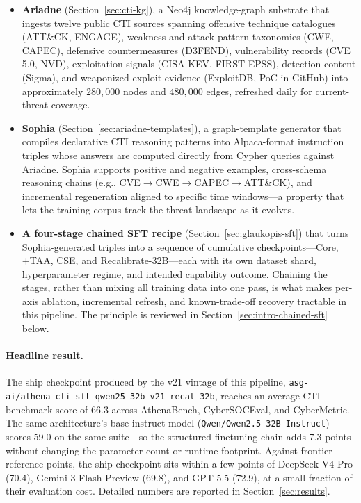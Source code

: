 \documentclass[unnumsec,webpdf,contemporary,large]{oup-authoring-template}
\theoremstyle{thmstyleone}
\theoremstyle{thmstyletwo}
\theoremstyle{thmstylethree}
\begin{document}
\begin{itemize}
  \item \textbf{Ariadne} (Section~\ref{sec:cti-kg}), a Neo4j knowledge-graph substrate that ingests twelve public CTI sources spanning offensive technique catalogues (ATT\&CK, ENGAGE), weakness and attack-pattern taxonomies (CWE, CAPEC), defensive countermeasures (D3FEND), vulnerability records (CVE 5.0, NVD), exploitation signals (CISA KEV, FIRST EPSS), detection content (Sigma), and weaponized-exploit evidence (ExploitDB, PoC-in-GitHub) into approximately $280{,}000$ nodes and $480{,}000$ edges, refreshed daily for current-threat coverage.

  \item \textbf{Sophia} (Section~\ref{sec:ariadne-templates}), a graph-template generator that compiles declarative CTI reasoning patterns into Alpaca-format instruction triples whose answers are computed directly from Cypher queries against Ariadne. Sophia supports positive and negative examples, cross-schema reasoning chains (e.g., CVE$\to$CWE$\to$CAPEC$\to$ATT\&CK), and incremental regeneration aligned to specific time windows---a property that lets the training corpus track the threat landscape as it evolves.

  \item \textbf{A four-stage chained SFT recipe} (Section~\ref{sec:glaukopis-sft}) that turns Sophia-generated triples into a sequence of cumulative checkpoints---Core, +TAA, CSE, and Recalibrate-32B---each with its own dataset shard, hyperparameter regime, and intended capability outcome. Chaining the stages, rather than mixing all training data into one pass, is what makes per-axis ablation, incremental refresh, and known-trade-off recovery tractable in this pipeline. The principle is reviewed in Section~\ref{sec:intro-chained-sft} below.
\end{itemize}

\paragraph{Headline result.}
The ship checkpoint produced by the v21 vintage of this pipeline, \texttt{asg-ai/athena-cti-sft-qwen25-32b-v21-recal-32b}, reaches an average CTI-benchmark score of 66.3 across AthenaBench, CyberSOCEval, and CyberMetric. The same architecture's base instruct model (\texttt{Qwen/Qwen2.5-32B-Instruct}) scores 59.0 on the same suite---so the structured-finetuning chain adds 7.3 points without changing the parameter count or runtime footprint. Against frontier reference points, the ship checkpoint sits within a few points of DeepSeek-V4-Pro (70.4), Gemini-3-Flash-Preview (69.8), and GPT-5.5 (72.9), at a small fraction of their evaluation cost. Detailed numbers are reported in Section~\ref{sec:results}.
\end{document}
